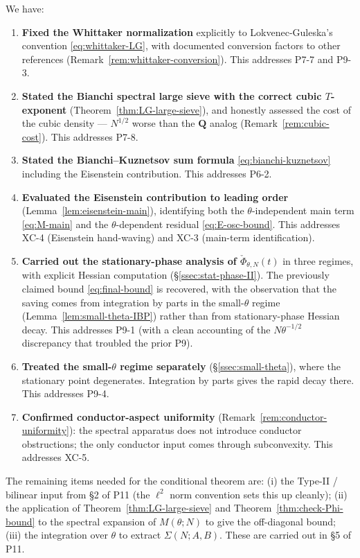 \documentclass[11pt]{article}
\theoremstyle{definition}
\newcommand{\Q}{\mathbf{Q}}
\begin{document}
We have:
\begin{enumerate}
   \item \textbf{Fixed the Whittaker normalization} explicitly to Lokvenec-Guleska's convention \eqref{eq:whittaker-LG}, with documented conversion factors to other references (Remark~\ref{rem:whittaker-conversion}). This addresses P7-7 and P9-3.
   \item \textbf{Stated the Bianchi spectral large sieve with the correct cubic $T$-exponent} (Theorem~\ref{thm:LG-large-sieve}), and honestly assessed the cost of the cubic density — $N^{1/2}$ worse than the $\Q$ analog (Remark~\ref{rem:cubic-cost}). This addresses P7-8.
   \item \textbf{Stated the Bianchi--Kuznetsov sum formula} \eqref{eq:bianchi-kuznetsov} including the Eisenstein contribution. This addresses P6-2.
   \item \textbf{Evaluated the Eisenstein contribution to leading order} (Lemma~\ref{lem:eisenstein-main}), identifying both the $\theta$-independent main term \eqref{eq:M-main} and the $\theta$-dependent residual \eqref{eq:E-osc-bound}. This addresses XC-4 (Eisenstein hand-waving) and XC-3 (main-term identification).
   \item \textbf{Carried out the stationary-phase analysis of $\check\Phi_{\theta,N}(t)$} in three regimes, with explicit Hessian computation (\S\ref{ssec:stat-phase-II}). The previously claimed bound \eqref{eq:final-bound} is recovered, with the observation that the saving comes from integration by parts in the small-$\theta$ regime (Lemma~\ref{lem:small-theta-IBP}) rather than from stationary-phase Hessian decay. This addresses P9-1 (with a clean accounting of the $N\theta^{-1/2}$ discrepancy that troubled the prior P9).
   \item \textbf{Treated the small-$\theta$ regime separately} (\S\ref{ssec:small-theta}), where the stationary point degenerates. Integration by parts gives the rapid decay there. This addresses P9-4.
   \item \textbf{Confirmed conductor-aspect uniformity} (Remark~\ref{rem:conductor-uniformity}): the spectral apparatus does not introduce conductor obstructions; the only conductor input comes through subconvexity. This addresses XC-5.
\end{enumerate}

The remaining items needed for the conditional theorem are: (i) the Type-II / bilinear input from \S2 of P11 (the $\ell^2$ norm convention sets this up cleanly); (ii) the application of Theorem~\ref{thm:LG-large-sieve} and Theorem~\ref{thm:check-Phi-bound} to the spectral expansion of $M(\theta;N)$ to give the off-diagonal bound; (iii) the integration over $\theta$ to extract $\Sigma(N;A,B)$. These are carried out in \S5 of P11.
\end{document}
